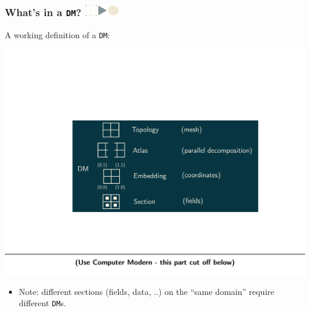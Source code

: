 \documentclass{beamer}
\newcommand\frametitlelogo[1]{\frametitle{#1\hspace{0pt plus 1 filll} \includegraphics[width=42pt]{logo_slides}}}
\begin{document}
\begin{frame}[fragile]
  \frametitlelogo{What's in a \texttt{DM}?}
  A working definition of a \texttt{DM}:
\begin{center}
\includegraphics[width=\textwidth]{whatsadm_cut}
\end{center}
\begin{itemize}
  \item  Note: different sections (fields, data, ..) on the ``same domain'' require different \texttt{DM}s.
\end{itemize}
\end{frame}
\end{document}
